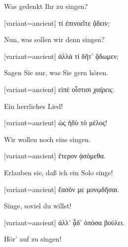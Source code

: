Was gedenkt Ihr zu singen? 

\switchcolumn

\begin{greek}[variant=ancient]%
τί ἐπινοεῖτε ᾄδειν;

\end{greek}%
\switchcolumn*

Nun, was sollen wir denn singen? 

\switchcolumn

\begin{greek}[variant=ancient]%
ἀλλὰ τί δῆτ' ᾄδωμεν;

\end{greek}%
\switchcolumn*

Sagen Sie nur, was Sie gern hören. 

\switchcolumn

\begin{greek}[variant=ancient]%
εἰπὲ οἶστισι \emph{χαίρεις.}

\end{greek}%
\switchcolumn*

Ein herrliches Lied! 

\switchcolumn

\begin{greek}[variant=ancient]%
ὡς ἡδὺ τὸ μέλος!

\end{greek}%
\switchcolumn*

Wir wollen noch eins singen. 

\switchcolumn

\begin{greek}[variant=ancient]%
ἕτερον ᾀσόμεθα.

\end{greek}%
\switchcolumn*

Erlauben sie, daß ich ein Solo singe! 

\switchcolumn

\begin{greek}[variant=ancient]%
ἔασόν με μονῳδῆσαι.

\end{greek}%
\switchcolumn*

Singe, soviel du willst! 

\switchcolumn

\begin{greek}[variant=ancient]%
ἀλλ' ᾆδ' ὁπόσα βούλει.

\end{greek}%
\switchcolumn*

Hör' auf zu singen! 


